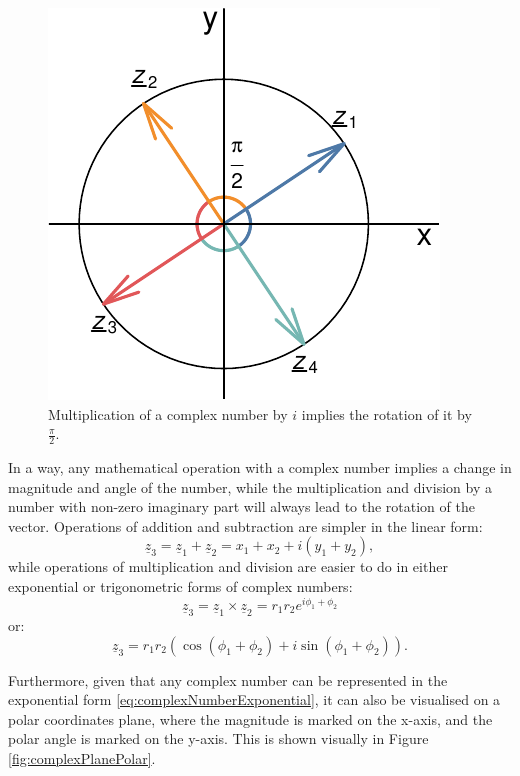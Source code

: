 \documentclass[
]{book}
\begin{document}
\begin{figure}
\centering
\includegraphics{Svetunkov---Svetunkov---Complex-Dynamic-Models_files/figure-latex/complexPlaneMultiplication-1.pdf}
\caption{\label{fig:complexPlaneMultiplication}Multiplication of a complex number by \(i\) implies the rotation of it by \(\frac{\pi}{2}\).}
\end{figure}

In a way, any mathematical operation with a complex number implies a change in magnitude and angle of the number, while the multiplication and division by a number with non-zero imaginary part will always lead to the rotation of the vector. Operations of addition and subtraction are simpler in the linear form:
\begin{equation*}
    \underline{z}_3 = \underline{z}_1 + \underline{z}_2 = x_1 + x_2 + i (y_1 + y_2) ,
\end{equation*}
while operations of multiplication and division are easier to do in either exponential or trigonometric forms of complex numbers:
\begin{equation*}
    \underline{z}_3 = \underline{z}_1 \times \underline{z}_2 = r_1 r_2 e^{i \phi_1 + \phi_2} 
\end{equation*}
or:
\begin{equation*}
    \underline{z}_3 = r_1 r_2 \left(\cos (\phi_1 + \phi_2) + i \sin (\phi_1 + \phi_2) \right) .
\end{equation*}

Furthermore, given that any complex number can be represented in the exponential form \eqref{eq:complexNumberExponential}, it can also be visualised on a polar coordinates plane, where the magnitude is marked on the x-axis, and the polar angle is marked on the y-axis. This is shown visually in Figure \ref{fig:complexPlanePolar}.
\end{document}
